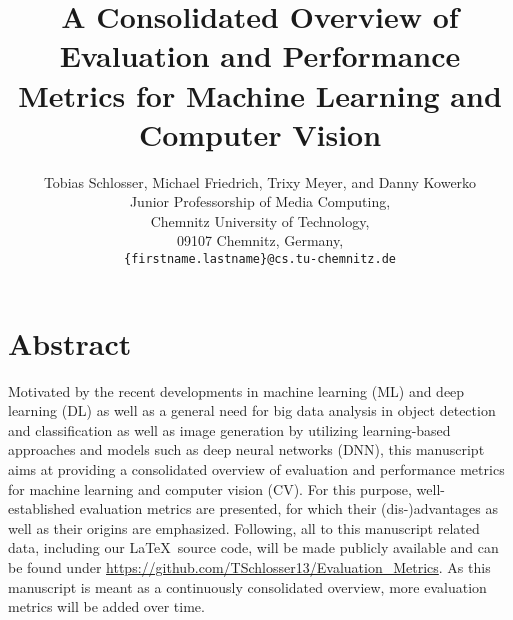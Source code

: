 \documentclass{article}
\newcommand{\ORCID}[1]{\thinspace\textsuperscript{\href{https://orcid.org/#1}{\textcolor[HTML]{A6CE39}{\faOrcid}}}}
\newcommand{\ORCIDFriedrich}{0000-0001-6326-4749} %
\newcommand{\ORCIDKowerko}{0000-0002-4538-7814}   %
\newcommand{\ORCIDMeyer}{0000-0002-3372-1619}     %
\newcommand{\ORCIDSchlosser}{0000-0002-0682-4284} %
\begin{document}
\title{\Huge A Consolidated Overview of Evaluation and Performance Metrics for Machine Learning and Computer Vision}

\author{
	Tobias Schlosser\ORCID{\ORCIDSchlosser}, Michael Friedrich\ORCID{\ORCIDFriedrich}, Trixy Meyer\ORCID{\ORCIDMeyer}, and Danny Kowerko\ORCID{\ORCIDKowerko} \\[1ex]
	Junior Professorship of Media Computing, \\
	Chemnitz University of Technology, \\
	09107 Chemnitz, Germany, \\
	\texttt{\{firstname.lastname\}@cs.tu-chemnitz.de}
}




\maketitle




\section*{Abstract}

Motivated by the recent developments in machine learning (ML) and deep learning (DL) as well as a general need for big data analysis in object detection and classification as well as image generation by utilizing learning-based approaches and models such as deep neural networks (DNN), this manuscript aims at providing a consolidated overview of evaluation and performance metrics for machine learning and computer vision (CV). For this purpose, well-established evaluation metrics are presented, for which their (dis-)advantages as well as their origins are emphasized. Following, all to this manuscript related data, including our \LaTeX~source code, will be made publicly available and can be found under \url{https://github.com/TSchlosser13/Evaluation_Metrics}. As this manuscript is meant as a continuously consolidated overview, more evaluation metrics will be added over time.




\clearpage
\end{document}
